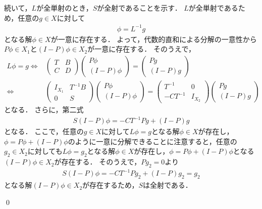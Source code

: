\begin{Proof}
続いて，$L$が全単射のとき，$S$が全射であることを示す．
$L$が全単射であるため，任意の$g \in X$に対して
\begin{align*}
	\phi = L^{-1} g
\end{align*}
となる解$\phi \in X$が一意に存在する．
よって，代数的直和による分解の一意性から$P \phi \in X_1$と$(I-P)\phi \in X_2$が一意に存在する．
そのうえで，
\begin{align*}
	L \phi = g \Leftrightarrow& \left( \begin{array}{cc}
		T & B \\
		C & D
	\end{array} \right)\left( \begin{array}{c}
		P \phi \\
		(I - P) \phi
	\end{array} \right) = \left( \begin{array}{c}
		P g \\
		(I - P) g
	\end{array} \right) \\
	\Leftrightarrow& \left( \begin{array}{cc}
		I_{X_1} & T^{-1} B \\
		0 & S
	\end{array} \right) \left( \begin{array}{c}
		P \phi \\
		(I - P) \phi
	\end{array} \right) = \left( \begin{array}{cc}
		T^{-1} & 0  \\
		-CT^{-1} & I_{X_2}
	\end{array} \right) \left( \begin{array}{c}
		Pg \\
		(I-P)g
	\end{array} \right)
\end{align*}
となる．
さらに，第二式
\begin{align*}
	S (I - P) \phi = -CT^{-1} Pg + (I - P)g
\end{align*}
となる．
ここで，任意の$g \in X$に対して$L \phi = g$となる解$\phi \in X$が存在し，$\phi = P \phi + (I - P)\phi$のように一意に分解できることに注意すると，任意の$g_2 \in X_2$に対しても$L \phi = g_2$となる解$\phi \in X$が存在し，$\phi = P \phi + (I - P)\phi$となる$(I - P)\phi \in X_2$が存在する．
そのうえで，$P g_2 = 0$より
\begin{align*}
	S (I - P) \phi = -CT^{-1} Pg_2 + (I - P)g_2 = g_2
\end{align*}
となる解$(I - P) \phi \in X_2$が存在するため，$S$は全射である．

\qed
\end{Proof}



